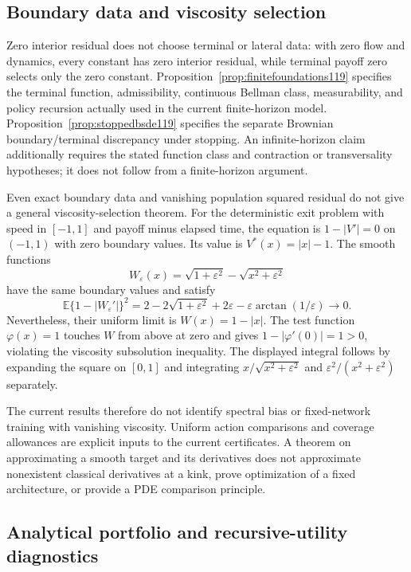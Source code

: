 \subsection{Boundary data and viscosity selection}
\label{dev:viscosity119}

Zero interior residual does not choose terminal or lateral data: with zero
flow and dynamics, every constant has zero interior residual, while terminal
payoff zero selects only the zero constant.  Proposition~\ref{prop:finitefoundations119}
specifies the terminal function, admissibility, continuous Bellman class,
measurability, and policy recursion actually used in the current finite-horizon
model.  Proposition~\ref{prop:stoppedbsde119} specifies the separate Brownian
boundary/terminal discrepancy under stopping.  An infinite-horizon claim
additionally requires the stated function class and contraction or
transversality hypotheses; it does not follow from a finite-horizon argument.

Even exact boundary data and vanishing population squared residual do not
give a general viscosity-selection theorem.  For the deterministic exit
problem with speed in $[-1,1]$ and payoff minus elapsed time, the equation is
$1-|V'|=0$ on $(-1,1)$ with zero boundary values.  Its value is
$V^*(x)=|x|-1$.  The smooth functions
\[
 W_\varepsilon(x)=\sqrt{1+\varepsilon^2}
                      -\sqrt{x^2+\varepsilon^2}
\]
have the same boundary values and satisfy
\[
 \mathbb E\{1-|W_\varepsilon'|\}^2
 =2-2\sqrt{1+\varepsilon^2}+2\varepsilon
       -\varepsilon\arctan(1/\varepsilon)\longrightarrow0.
\]
Nevertheless, their uniform limit is $W(x)=1-|x|$.  The test function
$\varphi(x)=1$ touches $W$ from above at zero and gives
$1-|\varphi'(0)|=1>0$, violating the viscosity subsolution inequality.
The displayed integral follows by expanding the square on $[0,1]$ and
integrating $x/\sqrt{x^2+\varepsilon^2}$ and
$\varepsilon^2/(x^2+\varepsilon^2)$ separately.

The current results therefore do not identify spectral bias or fixed-network
training with vanishing viscosity.  Uniform action comparisons and coverage
allowances are explicit inputs to the current certificates.  A theorem on
approximating a smooth target and its derivatives does not approximate
nonexistent classical derivatives at a kink, prove optimization of a fixed
architecture, or provide a PDE comparison principle.

\subsection{Analytical portfolio and recursive-utility diagnostics}
\label{dev:mertonez119}

